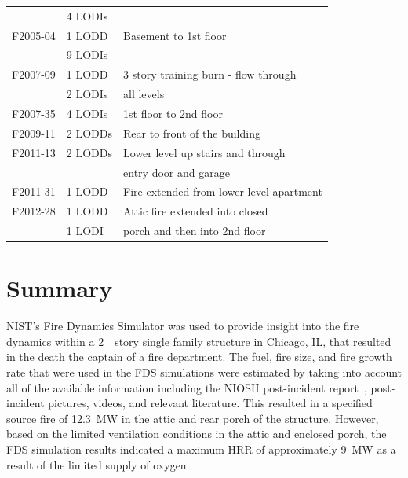 \documentclass[12pt,oneside]{book}
\begin{document}
\begin{table}
\begin{tabular}{lll}
                                    &  4 LODIs            &                                                       \\
F2005-04 \cite{NIOSH:McFall4}       &  1 LODD             &  Basement to 1st floor                                \\
                                    &  9 LODIs            &                                                       \\
F2007-09 \cite{NIOSH:Tarley}        &  1 LODD             &  3 story training burn - flow through                 \\
                                    &  2 LODIs            &  all levels                                           \\
F2007-35 \cite{NIOSH:Braddee}       &  4 LODIs            &  1st floor to 2nd floor                               \\
F2009-11 \cite{NIOSH:Merinar}       &  2 LODDs            &  Rear to front of the building                        \\
F2011-13 \cite{NIOSH:Bowyer2}       &  2 LODDs            &  Lower level up stairs and through                    \\
                                    &                     &  entry door and garage                                \\
F2011-31 \cite{NIOSH:Loflin}        &  1 LODD             &  Fire extended from lower level apartment             \\
F2012-28 \cite{NIOSH:Bowyer}        &  1 LODD             &  Attic fire extended into closed                      \\
                                    &  1 LODI             &  porch and then into 2nd floor                        \\
\bottomrule[1.25pt]
\end{tabular}\par
\end{table}

\chapter{Summary}
NIST's Fire Dynamics Simulator was used to provide insight into the fire dynamics within a 2~~story single family structure in Chicago, IL, that resulted in the death the captain of a fire department. The fuel, fire size, and fire growth rate that were used in the FDS simulations were estimated by taking into account all of the available information including the NIOSH post-incident report~\cite{NIOSH:Bowyer}, post-incident pictures, videos, and relevant literature. This resulted in a specified source fire of 12.3~MW in the attic and rear porch of the structure. However, based on the limited ventilation conditions in the attic and enclosed porch, the FDS simulation results indicated a maximum HRR of approximately 9~MW as a result of the limited supply of oxygen.
\end{document}

